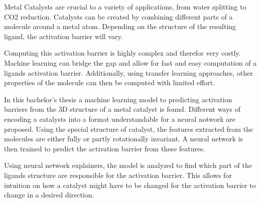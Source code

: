 
\Abstract

Metal Catalysts are crucial to a variety of applications, from water splitting to CO2 reduction.
Catalysts can be created by combining different parts of a molecule around a metal atom.
Depending on the structure of the resulting ligand, the activation barrier will vary.

Computing this activation barrier is highly complex and therefor very costly. 
Machine learning can bridge the gap and allow for fast and easy computation of a ligands activation barrier.
Additionally, using transfer learning approaches, other properties of the molecule can then be computed with limited effort.

In this bachelor's thesis a machine learning model to predicting activation barriers from the 3D structure of a metal catalyst is found. 
Different ways of encoding a catalysts into a format understandable for a neural notwork are proposed.
Using the special structure of catalyst, the features extracted from the molecules are either fully or partly rotationally invariant.
A neural network is then trained to predict the activation barrier from these features.

Using neural network explainers, the model is analyzed to find which part of the ligands structure are responsible for the activation barrier.
This allows for intuition on how a catalyst might have to be changed for the activation barrier to change in a desired direction.
